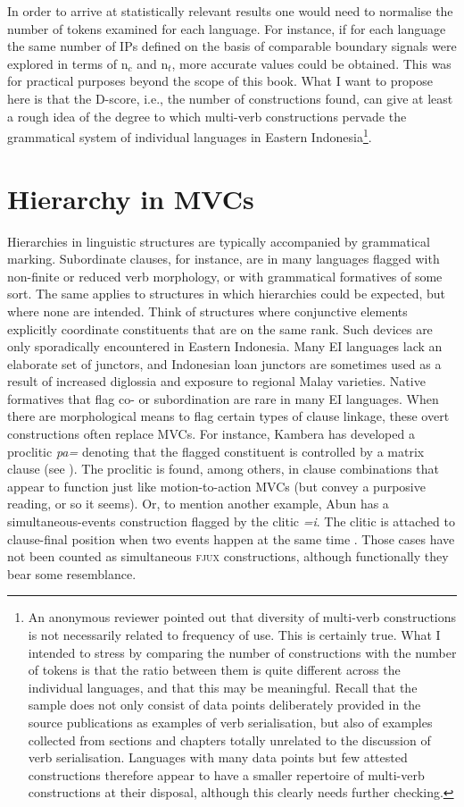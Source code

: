 In order to arrive at statistically relevant results one would need to normalise the number of tokens examined for each language. For instance, if for each language the same number of IPs defined on the basis of comparable boundary signals were explored in terms of n$_c$ and n$_t$, more accurate values could be obtained. This was for practical purposes beyond the scope of this book. What I want to propose here is that the D-score, i.e., the number of constructions found, can give at least a rough idea of the degree to which multi-verb constructions pervade the grammatical system of individual languages in Eastern Indonesia\footnote{An anonymous reviewer pointed out that diversity of multi-verb constructions is not necessarily related to frequency of use. This is certainly true. What I intended to stress by comparing the number of constructions with the number of tokens is that the ratio between them is quite different across the individual languages, and that this may be meaningful. Recall that the sample does not only consist of data points deliberately provided in the source publications as examples of verb serialisation, but also of examples collected from sections and chapters totally unrelated to the discussion of verb serialisation. Languages with many data points but few attested constructions therefore appear to have a smaller repertoire of multi-verb constructions at their disposal, although this clearly needs further checking.}.

\section{Hierarchy in MVCs} \label{sec:hierarchy}

Hierarchies in linguistic structures are typically accompanied by grammatical marking. Subordinate clauses, for instance, are in many languages flagged with non-finite or reduced verb morphology, or with grammatical formatives of some sort. The same applies to structures in which hierarchies could be expected, but where none are intended. Think of structures where conjunctive elements explicitly coordinate constituents that are on the same rank. Such devices are only sporadically encountered in Eastern Indonesia. Many EI languages lack an elaborate set of junctors, and Indonesian loan junctors are sometimes used as a result of increased diglossia and exposure to regional Malay varieties. Native formatives that flag co- or subordination are rare in many EI languages. When there are morphological means to flag certain types of clause linkage, these overt constructions often replace MVCs. For instance, Kambera has developed a proclitic \textit{pa=} denoting that the flagged constituent is controlled by a matrix clause (see \citealt[338ff.]{klamer1998grammar}). The proclitic is found, among others, in clause combinations that appear to function just like motion-to-action MVCs (but convey a purposive reading, or so it seems). Or, to mention another example, Abun has a simultaneous-events construction flagged by the clitic \textit{=i}. The clitic is attached to clause-final position when two events happen at the same time \citep{berry1999}. Those cases have not been counted as simultaneous \textsc{fjux} constructions, although functionally they bear some resemblance.

